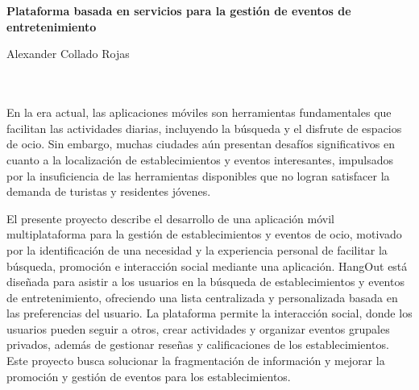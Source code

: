 \chapter*{}


%



\thispagestyle{empty}

\begin{center}
    {\large\bfseries Plataforma basada en servicios para la gestión de eventos de entretenimiento}\\
\end{center}
\begin{center}
    Alexander Collado Rojas\\
\end{center}

\\

\vspace{0.7cm}
\\

En la era actual, las aplicaciones móviles son herramientas fundamentales que facilitan las actividades diarias, incluyendo la búsqueda y el disfrute de espacios de ocio. Sin embargo, muchas ciudades aún presentan desafíos significativos en cuanto a la localización de establecimientos y eventos interesantes, impulsados por la insuficiencia de las herramientas disponibles que no logran satisfacer la demanda de turistas y residentes jóvenes.

El presente proyecto describe el desarrollo de una aplicación móvil multiplataforma para la gestión de establecimientos y eventos de ocio, motivado por la identificación de una necesidad y la experiencia personal de facilitar la búsqueda, promoción e interacción social mediante una aplicación. HangOut está diseñada para asistir a los usuarios en la búsqueda de establecimientos y eventos de entretenimiento, ofreciendo una lista centralizada y personalizada basada en las preferencias del usuario. La plataforma permite la interacción social, donde los usuarios pueden seguir a otros, crear actividades y organizar eventos grupales privados, además de gestionar reseñas y calificaciones de los establecimientos. Este proyecto busca solucionar la fragmentación de información y mejorar la promoción y gestión de eventos para los establecimientos.
\cleardoublepage


